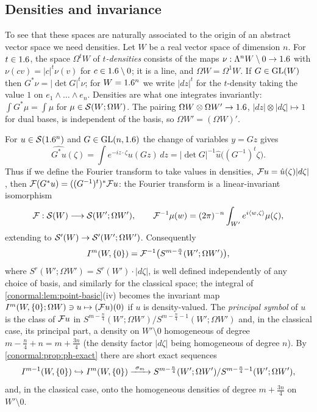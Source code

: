 \subsection{Densities and invariance}
To see that these spaces are naturally associated to the origin of an abstract
vector space we need densities.  Let $W$ be a real vector space of dimension
$n$.  For $t\in1.6$, the space $\Omega^tW$ of \emph{$t$-densities} consists of the
maps $\nu:\Lambda^nW\setminus0\to1.6$ with $\nu(cv)=|c|^t\nu(v)$ for
$c\in1.6\setminus0$; it is a line, and $\Omega W=\Omega^1W$.  If $G\in\operatorname{GL}(W)$
then $G^*\nu=|\det G|^t\nu$; for $W=1.6^n$ we write $|dz|^t$ for the $t$-density
taking the value $1$ on $e_1\wedge\dots\wedge e_n$.  Densities are what one
integrates invariantly: $\int G^*\mu=\int\mu$ for $\mu\in\mathcal{S}(W;\Omega W)$.  The
pairing $\Omega W\otimes\Omega W'\to1.6$, $|dz|\otimes|d\zeta|\mapsto1$ for dual
bases, is independent of the basis, so $\Omega W'=(\Omega W)'$.

For $u\in\mathcal{S}(1.6^n)$ and $G\in\operatorname{GL}(n,1.6)$ the change of variables $y=Gz$ gives
\begin{equation*}
  \widehat{G^*u}(\zeta)=\int e^{-iz\cdot\zeta}u(Gz)\,dz
  =|\det G|^{-1}\hat u\big((G^{-1})^t\zeta\big).
\end{equation*}
Thus if we define the Fourier transform to take values in densities,
$\mathcal{F} u=\hat u(\zeta)|d\zeta|$, then $\mathcal{F}(G^*u)=((G^{-1})^t)^*\mathcal{F} u$: the
Fourier transform is a linear-invariant isomorphism
\begin{equation}\label{conormal:eq:invariant-FT}
  \mathcal{F}:\mathcal{S}(W)\longrightarrow\mathcal{S}(W';\Omega W'),\qquad
  \mathcal{F}^{-1}\mu(w)=(2\pi)^{-n}\int_{W'}e^{i\langle w, \zeta\rangle}\mu(\zeta),
\end{equation}
extending to $\mathcal{S}'(W)\to\mathcal{S}'(W';\Omega W')$.  Consequently
\begin{equation*}
  I^{m}(W,\{0\})=\mathcal{F}^{-1}\big(S^{m-\frac n4}(W';\Omega W')\big),
\end{equation*}
where $S^r(W';\Omega W')=S^r(W')\cdot|d\zeta|$, is well defined independently of
any choice of basis, and similarly for the classical space; the integral of
\cref{conormal:lem:point-basic}(iv) becomes the invariant map
$I^{m}(W,\{0\};\Omega W)\ni u\mapsto(\mathcal{F} u)(0)$ if $u$ is density-valued.  The
\emph{principal symbol} of $u$ is the class of $\mathcal{F} u$ in
$S^{m-\frac n4}(W';\Omega W')/S^{m-\frac n4-1}(W';\Omega W')$ and, in the
classical case, its principal part, a density on $W'\setminus0$ homogeneous of
degree $m-\frac n4+n=m+\frac{3n}{4}$ (the density factor $|d\zeta|$ being
homogeneous of degree $n$).  By \cref{conormal:prop:ph-exact} there are short
exact sequences
\begin{equation*}
  \Ic{m-1}(W,\{0\})\hookrightarrow\Ic{m}(W,\{0\})\xrightarrow{\ \sigma_m\ }
  S^{m-\frac n4}(W';\Omega W')/S^{m-\frac n4-1}(W';\Omega W'),
\end{equation*}
and, in the classical case, onto the homogeneous densities of degree
$m+\frac{3n}4$ on $W'\setminus0$.

